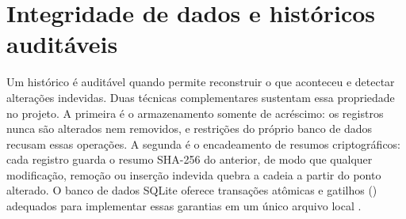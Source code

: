 \section{Integridade de dados e históricos auditáveis}

Um histórico é auditável quando permite reconstruir o que aconteceu e detectar alterações indevidas.
Duas técnicas complementares sustentam essa propriedade no projeto. A primeira é o armazenamento
somente de acréscimo: os registros nunca são alterados nem removidos, e restrições do próprio banco de
dados recusam essas operações. A segunda é o encadeamento de resumos criptográficos: cada registro
guarda o resumo SHA-256 \cite{nist2015} do anterior, de modo que qualquer modificação, remoção ou
inserção indevida quebra a cadeia a partir do ponto alterado. O banco de dados SQLite oferece
transações atômicas e gatilhos () adequados para implementar essas garantias em um único
arquivo local \cite{sqlite}.
